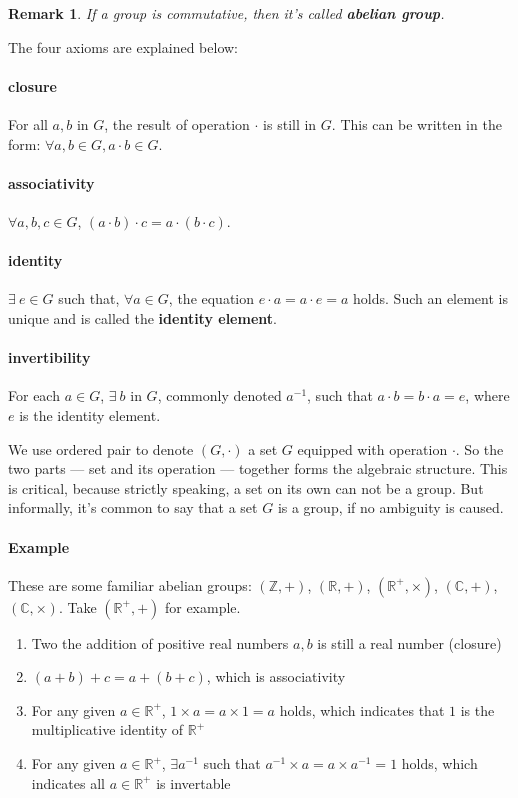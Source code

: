 \documentclass[UTF8]{ctexart}
\theoremstyle{mystyle}
\theoremstyle{myremark}
\newtheorem*{remark}{Remark}
\theoremstyle{plain}
\newcommand{\R}{\mathbb R}
\newcommand{\Z}{\mathbb Z}
\newcommand{\C}{\mathbb C}
\begin{document}
\begin{remark}
    If a group is commutative, then it's called \textbf{abelian group}.
\end{remark}

The four axioms are explained below:
\paragraph{closure}
For all $ a, b $ in $ G $, the result of operation $ \cdot $ is still in $ G $. This can be written in the form: $ \forall a, b \in G, a \cdot b \in G $.

\paragraph{associativity}
$ \forall a, b, c \in G $, $ (a \cdot b) \cdot c = a \cdot (b \cdot c) $.

\paragraph{identity}
$ \exists\ e \in G $ such that, $ \forall a \in G $, the equation $ e \cdot a = a \cdot e = a $ holds. Such an element is unique and is called the \textbf{identity element}.

\paragraph{invertibility}
For each $ a \in G $, $ \exists\ b $ in $ G $, commonly denoted $ a^{-1} $, such that $ a \cdot b = b \cdot a = e $, where $ e $ is the identity element.

We use ordered pair to denote $ (G, \cdot) $ a set $ G $ equipped with operation $ \cdot $. So the two parts --- set and its operation --- together forms the algebraic structure. This is critical, because strictly speaking, a set on its own can not be a group. But informally, it's common to say that a set $ G $ is a group, if no ambiguity is caused.

\paragraph{Example}
These are some familiar abelian groups: $ (\Z, +) $, $ (\R, +) $, $ (\R^+, \times) $, $ (\C, +) $, $ (\C, \times) $. Take $ (\R^+, +) $ for example. 

\begin{enumerate}
    \item Two the addition of positive real numbers $ a, b $ is still a real number (closure)
    \item $ (a + b) + c = a + (b + c) $, which is associativity
    \item For any given $ a \in \R^+ $, $ 1 \times a = a \times 1 = a $ holds, which indicates that $ 1 $ is the multiplicative identity of $ \R^+ $
    \item For any given $ a \in \R^+ $, $ \exists a^{-1} $ such that $ a^{-1} \times a = a \times a^{-1} = 1 $ holds, which indicates all $ a \in \R^+ $ is invertable
\end{enumerate}
\end{document}

